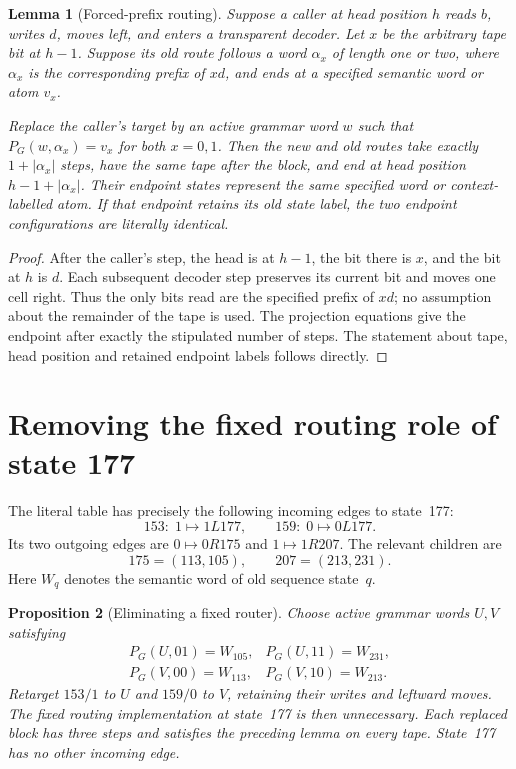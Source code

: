 \documentclass[11pt]{article}
\newtheorem{lemma}{Lemma}
\newtheorem{proposition}[lemma]{Proposition}
\newcommand{\Word}[1]{W_{#1}}
\begin{document}
\begin{lemma}[Forced-prefix routing]
Suppose a caller at head position $h$ reads $b$, writes $d$, moves left,
and enters a transparent decoder. Let $x$ be the arbitrary tape bit at $h-1$.
Suppose its old route follows a word $\alpha_x$ of length one or two, where
$\alpha_x$ is the corresponding prefix of $xd$, and ends at a specified
semantic word or atom $v_x$.

Replace the caller's target by an active grammar word $w$ such that
$P_G(w,\alpha_x)=v_x$ for both $x=0,1$. Then the new and old routes take
exactly $1+|\alpha_x|$ steps, have the same tape after the block, and end at
head position $h-1+|\alpha_x|$. Their endpoint states represent the same
specified word or context-labelled atom. If that endpoint retains its old
state label, the two endpoint configurations are literally identical.
\end{lemma}

\begin{proof}
After the caller's step, the head is at $h-1$, the bit there is $x$, and the
bit at $h$ is $d$. Each subsequent decoder step preserves its current bit
and moves one cell right. Thus the only bits read are the specified prefix
of $xd$; no assumption about the remainder of the tape is used. The
projection equations give the endpoint after exactly the stipulated number
of steps. The statement about tape, head position and retained endpoint
labels follows directly.
\end{proof}

\section{Removing the fixed routing role of state 177}

The literal table has precisely the following incoming edges to state~177:
\[
 153:\;1\mapsto 1L177,\qquad
 159:\;0\mapsto 0L177.
\]
Its two outgoing edges are $0\mapsto0R175$ and $1\mapsto1R207$.
The relevant children are
\[
 175=(113,105),\qquad 207=(213,231).
\]
Here $\Word q$ denotes the semantic word of old sequence state~$q$.

\begin{proposition}[Eliminating a fixed router]
Choose active grammar words $U,V$ satisfying
\[
\begin{array}{ll}
 P_G(U,01)=\Word{105}, & P_G(U,11)=\Word{231},\\
 P_G(V,00)=\Word{113}, & P_G(V,10)=\Word{213}.
\end{array}
\]
Retarget $153/1$ to $U$ and $159/0$ to $V$, retaining their writes and
leftward moves. The fixed routing implementation at state~177 is then
unnecessary. Each replaced block has three steps and satisfies the preceding
lemma on every tape. State~177 has no other incoming edge.
\end{proposition}
\end{document}
